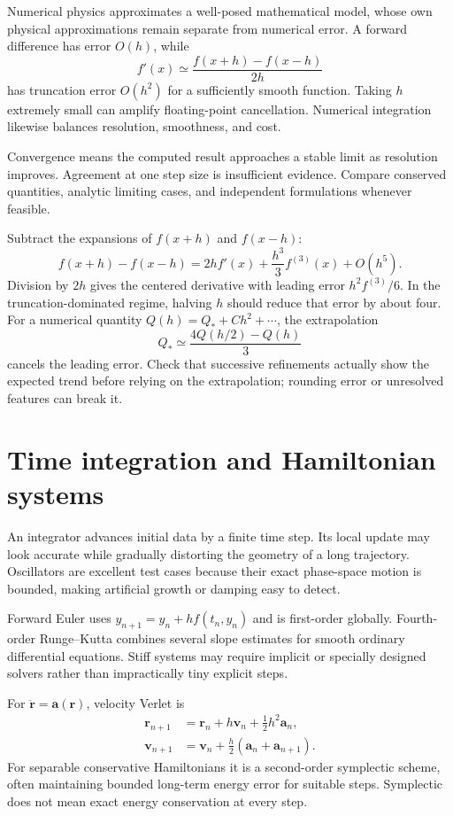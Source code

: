 \documentclass[11pt,oneside]{book}
\newcommand{\vect}[1]{\boldsymbol{#1}}
\theoremstyle{reviewstyle}
\begin{document}
Numerical physics approximates a well-posed mathematical model, whose own physical approximations remain separate from numerical error. A forward difference has error $O(h)$, while
\begin{equation}f'(x)\simeq\frac{f(x+h)-f(x-h)}{2h}\end{equation}
has truncation error $O(h^2)$ for a sufficiently smooth function. Taking $h$ extremely small can amplify floating-point cancellation. Numerical integration likewise balances resolution, smoothness, and cost.

Convergence means the computed result approaches a stable limit as resolution improves. Agreement at one step size is insufficient evidence. Compare conserved quantities, analytic limiting cases, and independent formulations whenever feasible.

Subtract the expansions of $f(x+h)$ and $f(x-h)$:
\begin{equation}
f(x+h)-f(x-h)=2hf'(x)+\frac{h^3}{3}f^{(3)}(x)+O(h^5).
\end{equation}
Division by $2h$ gives the centered derivative with leading error $h^2f^{(3)}/6$. In the truncation-dominated regime, halving $h$ should reduce that error by about four. For a numerical quantity $Q(h)=Q_*+Ch^2+\cdots$, the extrapolation
\begin{equation}
Q_*\simeq\frac{4Q(h/2)-Q(h)}3
\end{equation}
cancels the leading error. Check that successive refinements actually show the expected trend before relying on the extrapolation; rounding error or unresolved features can break it.

\section{Time integration and Hamiltonian systems}
An integrator advances initial data by a finite time step. Its local update may look accurate while gradually distorting the geometry of a long trajectory. Oscillators are excellent test cases because their exact phase-space motion is bounded, making artificial growth or damping easy to detect.

Forward Euler uses $y_{n+1}=y_n+h f(t_n,y_n)$ and is first-order globally. Fourth-order Runge--Kutta combines several slope estimates for smooth ordinary differential equations. Stiff systems may require implicit or specially designed solvers rather than impractically tiny explicit steps.

For $\ddot{\vect r}=\vect a(\vect r)$, velocity Verlet is
\begin{align}
\vect r_{n+1}&=\vect r_n+h\vect v_n+\tfrac12h^2\vect a_n,\\
\vect v_{n+1}&=\vect v_n+\tfrac h2(\vect a_n+\vect a_{n+1}).
\end{align}
For separable conservative Hamiltonians it is a second-order symplectic scheme, often maintaining bounded long-term energy error for suitable steps. Symplectic does not mean exact energy conservation at every step.
\end{document}

